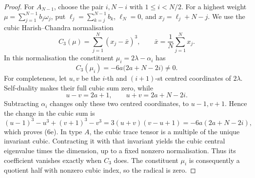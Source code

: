 \documentclass[11pt]{article}
\theoremstyle{remark}
\begin{document}
\begin{proof}
For \(A_{N-1}\), choose the pair \(i,N-i\) with \(1\le i<N/2\).
For a highest weight \(\mu=\sum_{j=1}^{N-1}b_j\omega_j\), put
\(\ell_j=\sum_{k=j}^{N-1}b_k\), \(\ell_N=0\), and
\(x_j=\ell_j+N-j\). We use the cubic Harish--Chandra normalisation
\[
 C_3(\mu)=\sum_{j=1}^N(x_j-\bar x)^3,\qquad
 \bar x=\frac1N\sum_{j=1}^N x_j.
\]
In this normalisation the constituent \(\mu_i=2\lambda-\alpha_i\) has
\[
 C_3(\mu_i)=-6a\bigl(2a+N-2i\bigr)\ne0. \tag{6e}
\]
For completeness, let \(u,v\) be the \(i\)-th and \((i+1)\)-st centred
coordinates of \(2\lambda\). Self-duality makes their full cubic sum zero,
while
\[
 u-v=2a+1,\qquad u+v=2a+N-2i.
\]
Subtracting \(\alpha_i\) changes only these two centred coordinates, to
\(u-1,v+1\). Hence the change in the cubic sum is
\[
 (u-1)^3-u^3+(v+1)^3-v^3
 =3(u+v)(v-u+1)=-6a(2a+N-2i),
\]
which proves \textup{(6e)}. In type \(A\), the cubic trace tensor is a
multiple of the unique invariant cubic. Contracting it with that invariant
yields the cubic central eigenvalue times the dimension, up to a fixed
nonzero normalisation. Thus its coefficient vanishes exactly when
\(C_3\) does. The constituent \(\mu_i\) is consequently a quotient half
with nonzero cubic index, so the radical is zero.


\end{proof}
\end{document}
